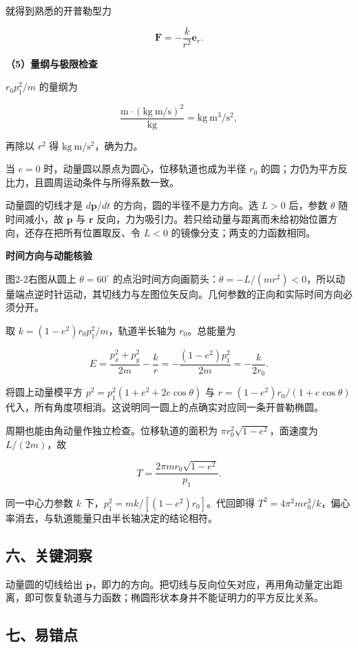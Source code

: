 \documentclass[12pt,a4paper,UTF8]{ctexart}
\begin{document}
就得到熟悉的开普勒型力

\[\bm F=-\frac{k}{r^2}\bm e_r.\]

\textbf{（5）量纲与极限检查}

\(r_0p_1^2/m\) 的量纲为

\[\frac{\mathrm m\cdot(\mathrm{kg}\ \mathrm{m/s})^2}{\mathrm{kg}}
=\mathrm{kg}\ \mathrm{m^3/s^2},\]

再除以 \(r^2\) 得 \(\mathrm{kg}\ \mathrm{m/s^2}\)，确为力。

当 \(e=0\) 时，动量圆以原点为圆心，位移轨道也成为半径 \(r_0\)
的圆；力仍为平方反比力，且圆周运动条件与所得系数一致。

动量圆的切线才是 \(d\bm p/dt\) 的方向，圆的半径不是力方向。选 \(L>0\)
后，参数 \(\theta\) 随时间减小，故 \(\dot{\bm p}\) 与 \(\bm r\)
反向，力为吸引力。若只给动量与距离而未给初始位置方向，还存在把所有位置取反、令
\(L<0\) 的镜像分支；两支的力函数相同。

\textbf{时间方向与动能核验}

图2-2右图从圆上 \(\theta=60^\circ\)
的点沿时间方向画箭头：\(\dot\theta=-L/(mr^2)<0\)，所以动量端点逆时针运动，其切线力与左图位矢反向。几何参数的正向和实际时间方向必须分开。

取 \(k=(1-e^2)r_0p_1^2/m\)，轨道半长轴为 \(r_0\)。总能量为

\[E=\frac{p_x^2+p_y^2}{2m}-\frac{k}{r}
=-\frac{(1-e^2)p_1^2}{2m}=-\frac{k}{2r_0}.\]

将圆上动量模平方 \(p^2=p_1^2(1+e^2+2e\cos\theta)\) 与
\(r=(1-e^2)r_0/(1+e\cos\theta)\)
代入，所有角度项相消。这说明同一圆上的点确实对应同一条开普勒椭圆。

周期也能由角动量作独立检查。位移轨道的面积为
\(\pi r_0^2\sqrt{1-e^2}\)，面速度为 \(L/(2m)\)，故

\[T=\frac{2\pi m r_0\sqrt{1-e^2}}{p_1}.\]

同一中心力参数 \(k\) 下，\(p_1^2=mk/[(1-e^2)r_0]\)。代回即得
\(T^2=4\pi^2mr_0^3/k\)，偏心率消去，与轨道能量只由半长轴决定的结论相符。

\subsection{六、关键洞察}\label{ux516dux5173ux952eux6d1eux5bdf-1}

动量圆的切线给出
\(\dot{\bm p}\)，即力的方向。把切线与反向位矢对应，再用角动量定出距离，即可恢复轨道与力函数；椭圆形状本身并不能证明力的平方反比关系。

\subsection{七、易错点}\label{ux4e03ux6613ux9519ux70b9-1}
\end{document}
